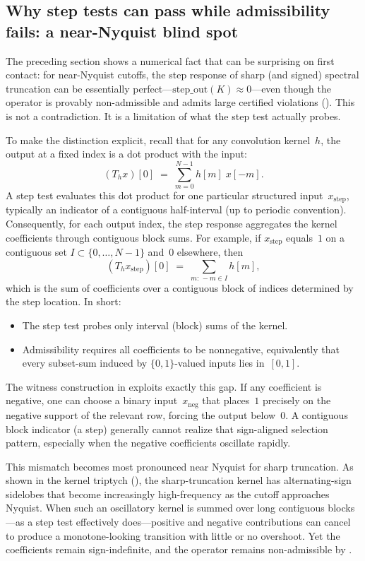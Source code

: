 \documentclass[11pt,a4paper]{article}
\theoremstyle{plain}
\theoremstyle{definition}
\theoremstyle{plain}
\newcommand{\xneg}{x_{\mathrm{neg}}}
\newcommand{\stepout}{\mathrm{step\_out}}
\begin{document}
\subsection{Why step tests can pass while admissibility fails: a near-Nyquist
  blind spot}
\label{sec:why-step-fails}

The preceding section shows a numerical fact that can be surprising on first
contact: for near-Nyquist cutoffs, the step response of sharp (and signed)
spectral truncation can be essentially perfect---$\stepout(K) \approx 0$---even
though the operator is provably non-admissible and admits large certified
violations ().  This is not a contradiction.  It
is a limitation of what the step test actually probes.

To make the distinction explicit, recall that for any convolution kernel~$h$, the
output at a fixed index is a dot product with the input:
\[
  (T_h x)[0]
  \;=\;
  \sum_{m=0}^{N-1} h[m]\; x[-m].
\]
A step test evaluates this dot product for one particular structured
input~$x_{\mathrm{step}}$, typically an indicator of a contiguous half-interval
(up to periodic convention).  Consequently, for each output index, the step
response aggregates the kernel coefficients through contiguous block sums.  For
example, if $x_{\mathrm{step}}$ equals~$1$ on a contiguous set
$I \subset \{0,\dots,N-1\}$ and~$0$ elsewhere, then
\[
  (T_h x_{\mathrm{step}})[0]
  \;=\;
  \sum_{m:\,-m \in I} h[m],
\]
which is the sum of coefficients over a contiguous block of indices determined by
the step location.  In short:

\begin{itemize}[leftmargin=2em]
  \item The step test probes only interval (block) sums of the kernel.
  \item Admissibility requires all coefficients to be nonnegative, equivalently
    that every subset-sum induced by $\{0,1\}$-valued inputs lies in~$[0,1]$.
\end{itemize}

The witness construction in  exploits exactly this
gap.  If any coefficient is negative, one can choose a binary input~$\xneg$ that
places~$1$ precisely on the negative support of the relevant row, forcing the
output below~$0$.  A contiguous block indicator (a step) generally cannot realize
that sign-aligned selection pattern, especially when the negative coefficients
oscillate rapidly.

This mismatch becomes most pronounced near Nyquist for sharp truncation.  As
shown in the kernel triptych (), the sharp-truncation
kernel has alternating-sign sidelobes that become increasingly high-frequency as
the cutoff approaches Nyquist.  When such an oscillatory kernel is summed over
long contiguous blocks---as a step test effectively does---positive and negative
contributions can cancel to produce a monotone-looking transition with little or
no overshoot.  Yet the coefficients remain sign-indefinite, and the operator
remains non-admissible by .
\end{document}
